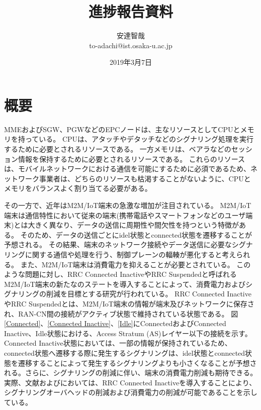 \documentclass[a4j]{ujarticle}
\title{進捗報告資料}
\author{安達智哉\\to-adachi@ist.osaka-u.ac.jp}
\date{2019年3月7日}
\begin{document}
\maketitle




\section{概要}
\label{sec:abs}
MMEおよびSGW、PGWなどのEPCノードは、主なリソースとしてCPUとメモリを持っている。
CPUは、アタッチやデタッチなどのシグナリング処理を実行するために必要とされるリソースである。
一方メモリは、ベアラなどのセッション情報を保持するために必要とされるリソースである。
これらのリソースは、モバイルネットワークにおける通信を可能にするために必須であるため、ネットワーク事業者は、どちらのリソースも枯渇することがないように、CPUとメモリをバランスよく割り当てる必要がある。

その一方で、近年はM2M/IoT端末の急激な増加が注目されている。
M2M/IoT端末は通信特性において従来の端末(携帯電話やスマートフォンなどのユーザ端末)とは大きく異なり、データの送信に周期性や間欠性を持つという特徴がある。
そのため、データの送信ごとにidel状態とconnected状態を遷移することが予想される。
その結果、端末のネットワーク接続やデータ送信に必要なシグナリングに関する通信や処理を行う、制御プレーンの輻輳が悪化すると考えられる。
また、M2M/IoT端末は消費電力を抑えることが必要とされている。
このような問題に対し、RRC Connected InactiveやRRC Suspendedと呼ばれるM2M/IoT端末の新たなのステートを導入することによって、消費電力およびシグナリングの削減を目標とする研究が行われている。
RRC Connected InactiveやRRC Suspendedとは、M2M/IoT端末の情報が端末及びネットワークに保存され、RAN-CN間の接続がアクティブ状態で維持されている状態である。
図\ref{Connected}、\ref{Connected Inactive}、\ref{Idle}にConnectedおよびConnected Inactive、Idle状態における、Access Stratum (AS)レイヤー以下の接続を示す。
Connected Inactive状態においては、一部の情報が保持されているため、connected状態へ遷移する際に発生するシグナリングは、idel状態とconnected状態を遷移することによって発生するシグナリングよりも小さくなることが予想される。さらに、シグナリングの削減に伴い、端末の消費電力削減も期待できる。
実際、文献\cite{RRCStateHandlingfor5G}および\cite{ANovelStateModelfor5GRadioAccessNetworks}においては、RRC Connected Inactiveを導入することにより、シグナリングオーバヘッドの削減および消費電力の削減が可能であることを示している。
\end{document}
